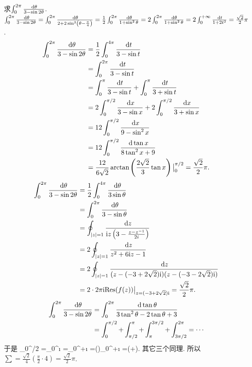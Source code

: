 \bq{}{}
求$\int_0^{2\pi}\frac{\,\mathrm{d} \theta}{3-\sin 2\theta}$.
\eq
\ba
$\int_0^{2\pi}\frac{\,\mathrm{d} \theta}{3-\sin 2\theta}
=\int_0^{2\pi}\frac{\,\mathrm{d} \theta}{2+2\sin^2\left(\theta-\frac{\pi}{4}\right)}
=\frac12\int_0^{2\pi}\frac{\,\mathrm{d} \theta}{1+\sin^2\theta}
=2\int_{0}^{2\pi}\frac{\,\mathrm{d} \theta}{1+\sin^2\theta}
=2\int_0^{+\infty}\frac{\,\mathrm{d} t}{1+2t^2}=\frac{\sqrt{2}}{2}\pi$.
\ea
\ba
\begin{align*}
 \int_0^{2\pi}\frac{\,\mathrm{d} \theta}{3-\sin 2\theta}
 &= \frac12\int_0^{4\pi}\frac{\,\mathrm{d} t}{3-\sin t}\\
 &= \int_0^{2\pi}\frac{\,\mathrm{d} t}{3-\sin t}\\
 &= \int_0^{\pi}\frac{\,\mathrm{d} t}{3-\sin t}+\int_{0}^{\pi}\frac{\,\mathrm{d} t}{3+\sin t}\\
 &= 2\int_{0}^{\pi/2}\frac{\,\mathrm{d} x}{3-\sin x}+2\int_{0}^{\pi/2}\frac{\,\mathrm{d} x}{3+\sin x}\\
 &= 12\int_{0}^{\pi/2}\frac{\,\mathrm{d} x}{9-\sin^2x}\\
 &= 12\int_0^{\pi/2}\frac{\,\mathrm{d}\tan x}{8\tan^2x+9}\\
 &= \frac{12}{6\sqrt{2}}\arctan\left(\frac{2\sqrt{2}}{3}\tan x\right)\big\vert_0^{\pi/2}
 =\frac{\sqrt{2}}{2}\pi.
\end{align*}
\ea
\ba
\begin{align*}
 \int_0^{2\pi}\frac{\,\mathrm{d} \theta}{3-\sin2\theta}
 &=\frac12\int_0^{4\pi}\frac{\,\mathrm{d} \theta}{3\sin\theta}\\
 &=\int_0^{2\pi}\frac{\,\mathrm{d} \theta}{3-\sin\theta}\\
 &=\oint_{\left\lvert z\right\rvert=1}\frac{\,\mathrm{d} z}{\mathrm{i} z\left(3-\frac{z-z^{-1}}{2i}\right)}\\
 &=2\oint_{\left\lvert z\right\rvert=1}\frac{\,\mathrm{d} z}{z^2+6\mathrm{i} z-1}\\
 &=2\oint_{\left\lvert z\right\rvert=1}\frac{\,\mathrm{d} z}{(z-(-3+2\sqrt{2})\mathrm{i})(z-(-3-2\sqrt{2})\mathrm{i})}\\
 &=2\cdot2\pi\mathrm{i}\mathrm{Res}(f(z))\big\vert_{z=(-3+2\sqrt{2})\mathrm{i}}
 =\frac{\sqrt{2}}{2}\pi.
\end{align*}
\ea
\ba
\begin{align*}
 \int_0^{2\pi}\frac{\,\mathrm{d} \theta}{3-\sin 2\theta}
 &=\int_0^{2\pi}\frac{\,\mathrm{d} \tan\theta}{3\tan^2\theta-2\tan\theta+3}\\
 &=\int_0^{\pi/2}+\int_{\pi/2}^{\pi}+\int_{\pi}^{3\pi/2}+\int_{3\pi/2}^{2\pi}=\cdots
\end{align*}
于是
\bee
\int_0^{\pi/2}
=\int_{0}^{\i}
=\int_0^{+\i}
=\cdot{}\arctan\left(\right)\big\vert_{0}^{+\i}
=\left(+\arctan{}\right).
\eee
其它三个同理. 所以$\sum=\frac{\sqrt{2}}{4}\left(\frac{\pi}{2}\cdot4\right)=\frac{\sqrt{2}}{2}\pi$.
\ea

